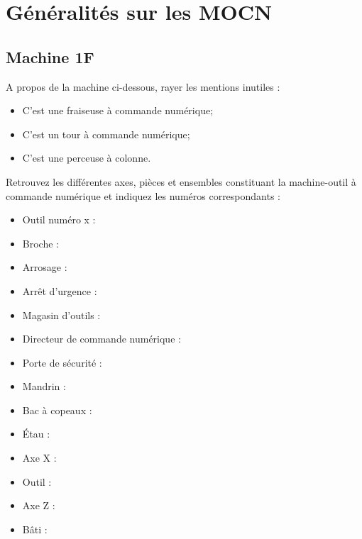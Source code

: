\documentclass[12pt]{article}
\newcounter{exo}
\newenvironment{exo}{\stepcounter{exo}\vspace{0.5cm}{\bfseries Question \theexo\ :}}{\par\vspace{0.5cm}}
\begin{document}
\section{Généralités sur les MOCN}
\subsection{Machine 1F}
\begin{exo}\label{exo1} A propos de la machine ci-dessous, rayer les mentions inutiles :
\begin{itemize}
    \item C'est une fraiseuse à commande numérique;
    \item C'est un tour à commande numérique;
    \item C'est une perceuse à colonne.
\end{itemize}
\end{exo}


\begin{exo}\label{exo1} Retrouvez les différentes axes, pièces et ensembles constituant la machine-outil à commande numérique et indiquez les numéros correspondants :\\ \end{exo}
\begin{minipage}{.55\linewidth}
\begin{itemize}
    \item Outil numéro x :
    \item Broche :
    \item Arrosage :
    \item Arrêt d’urgence :
    \item Magasin d’outils :
    \item Directeur de commande numérique :
    \item Porte de sécurité :
\end{itemize}

\end{minipage}
\begin{minipage}{.44\linewidth}
\begin{itemize}
    \item Mandrin :
    \item Bac à copeaux :
    \item Étau :
    \item Axe X :
    \item Outil :
    \item Axe Z :
    \item Bâti :
\end{itemize}
\end{minipage}
\end{document}
